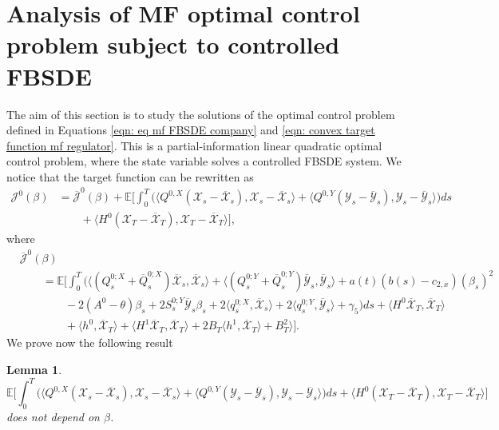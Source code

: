 \documentclass[10pt,a4paper]{amsart}
\newtheorem{lemma}[theorem]{Lemma}
\numberwithin{equation}{section}
\newcommand{\E}{\mathbb{E}}
\renewcommand{\bar}{\overline}
\begin{document}
 








\section{Analysis of MF optimal control problem subject to controlled FBSDE}\label{section_solution_MF_regulator_cpo}

The aim of this section is to study the solutions of the optimal control problem defined in Equations \eqref{eqn: eq mf FBSDE company} and \eqref{eqn: convex target function mf regulator}. This is a partial-information linear quadratic optimal control problem, where the state variable solves a controlled FBSDE system. We notice that the target function can be rewritten as 
\begin{align*}
    \mathcal{J}^0(\beta)    &= \bar{\mathcal{J}}^0(\beta) + \E\bigg[\int_0^T\bigg( \langle Q^{0,X}(\mathcal{X}_s - \bar{\mathcal{X}}_s), \mathcal{X}_s - \bar{\mathcal{X}}_s\rangle + \langle Q^{0,Y}(\mathcal{Y}_s - \bar{\mathcal{Y}}_s), \mathcal{Y}_s - \bar{\mathcal{Y}}_s\rangle \bigg) ds \\
    &\qquad+ \langle H^0 ( \mathcal{X}_T - \bar{\mathcal{X}}_T), \mathcal{X}_T - \bar{\mathcal{X}}_T\rangle \bigg],
\end{align*}
where 
\begin{align}
    &\label{eqn: convex target function mf regulator projected}
    \bar{\mathcal{J}}^0(\beta) \\
    &\nonumber\qquad = \E\Bigg[ \int_0^T \bigg(\langle (Q^{0;X}_s + \bar{Q}^{0;X}_s) \bar{\mathcal{X}}_s,\bar{\mathcal{X}}_s\rangle+\langle (Q^{0;Y}_s + \bar{Q}^{0;Y}_s) \bar{\mathcal{Y}}_s,\bar{\mathcal{Y}}_s\rangle +a(t)(b(s) -  c_{2,x})( \beta_s)^2\\
    &\nonumber\qquad \qquad-2(A^0 - \theta)\beta_s  + 2  S^{0;Y}_s \bar{\mathcal{Y}}_s  \beta_s  + 2 \langle q^{0;X}_s , \bar{\mathcal{X}}_s\rangle + 2 \langle q^{0;Y}_s ,\bar{\mathcal{Y}}_s\rangle + \gamma_5\bigg) ds + \langle H^0  \bar{\mathcal{X}}_T , \bar{\mathcal{X}}_T\rangle \\
    &\nonumber\qquad\qquad + \langle h^0, \bar{\mathcal{X}}_T\rangle+ \langle H^1\bar{\mathcal{X}}_T, \bar{\mathcal{X}}_T\rangle + 2B_T \langle h^1, \bar{\mathcal{X}}_T\rangle + B^2_T\rangle\Bigg].
\end{align}
We prove now the following result

\begin{lemma}
\label{lemma: filtering error independent of control}
\begin{equation*}\E\bigg[\int_0^T\bigg( \langle Q^{0,X}(\mathcal{X}_s - \bar{\mathcal{X}}_s), \mathcal{X}_s - \bar{\mathcal{X}}_s\rangle + \langle Q^{0,Y}(\mathcal{Y}_s - \bar{\mathcal{Y}}_s), \mathcal{Y}_s - \bar{\mathcal{Y}}_s\rangle \bigg) ds + \langle H^0  (\mathcal{X}_T - \bar{\mathcal{X}}_T), \mathcal{X}_T - \bar{\mathcal{X}}_T\rangle \bigg]
\end{equation*}
does not depend on $\beta$.
\end{lemma}
\end{document}
